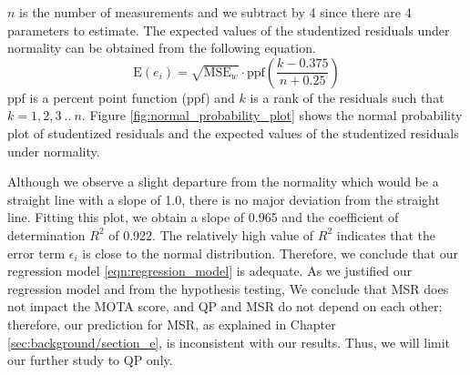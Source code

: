 $n$ is the number of measurements and we subtract by 4 since there are 4 parameters to estimate. The expected values of the studentized residuals under normality can be obtained from the following equation.
\begin{equation}
    \text{E}(e_i) = \sqrt{\text{MSE}_w} \cdot \text{ppf}( \frac{k - 0.375}{n + 0.25} )
\end{equation}
ppf is a percent point function (ppf) and $k$ is a rank of the residuals such that $k=1,2,3~..~n$. Figure \ref{fig:normal_probability_plot} shows the normal probability plot of studentized residuals and the expected values of the studentized residuals under normality.

Although we observe a slight departure from the normality which would be a straight line with a slope of 1.0, there is no major deviation from the straight line. Fitting this plot, we obtain a slope of 0.965 and the coefficient of determination $R^2$ of 0.922. The relatively high value of $R^2$ indicates that the error term $\epsilon_i$ is close to the normal distribution. Therefore, we conclude that our regression model \eqref{eqn:regression_model} is adequate. As we justified our regression model and from the hypothesis testing, We conclude that MSR does not impact the MOTA score, and QP and MSR do not depend on each other; therefore, our prediction for MSR, as explained in Chapter \ref{sec:background/section_e}, is inconsistent with our results. Thus, we will limit our further study to QP only.

